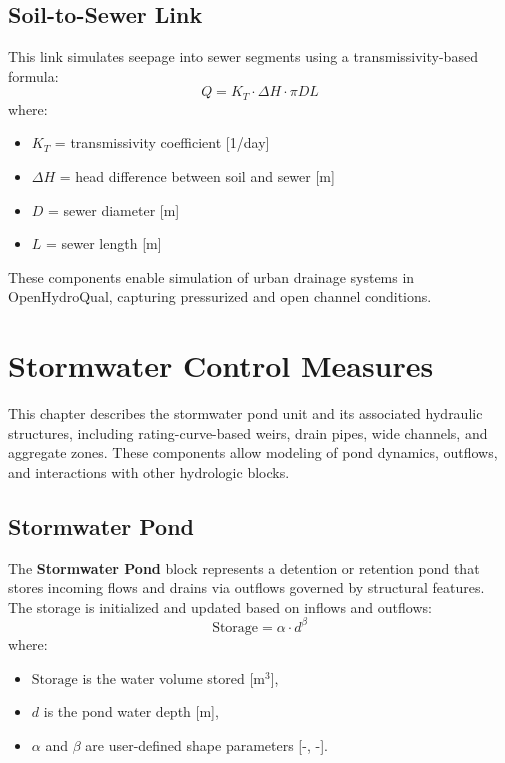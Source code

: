 \documentclass[12pt]{report}
\begin{document}
\section{Soil-to-Sewer Link}

This link simulates seepage into sewer segments using a transmissivity-based formula:
\begin{equation}
Q = K_T \cdot \Delta H \cdot \pi D L
\end{equation}
where:
\begin{itemize}
\item $K_T$ = transmissivity coefficient \textnormal{[1/day]}
\item $\Delta H$ = head difference between soil and sewer \textnormal{[m]}
\item $D$ = sewer diameter \textnormal{[m]}
\item $L$ = sewer length \textnormal{[m]}
\end{itemize}

These components enable simulation of urban drainage systems in OpenHydroQual, capturing pressurized and open channel conditions.

\chapter{Stormwater Control Measures}

This chapter describes the stormwater pond unit and its associated hydraulic structures, including rating-curve-based weirs, drain pipes, wide channels, and aggregate zones. These components allow modeling of pond dynamics, outflows, and interactions with other hydrologic blocks.

\section{Stormwater Pond}

The \textbf{Stormwater Pond} block represents a detention or retention pond that stores incoming flows and drains via outflows governed by structural features. The storage is initialized and updated based on inflows and outflows:
\begin{equation}
\text{Storage} = \alpha \cdot d^{\beta}
\end{equation}
where:
\begin{itemize}
\item $\text{Storage}$ is the water volume stored [m$^3$],
\item $d$ is the pond water depth [m],
\item $\alpha$ and $\beta$ are user-defined shape parameters [-, -].
\end{itemize}
\end{document}
